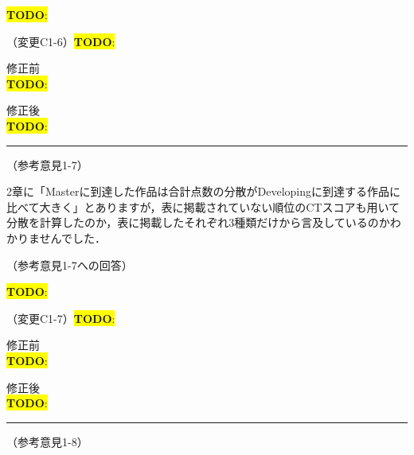 \documentclass{jarticle} %
\newcommand{\todo}[1]{\colorbox{yellow}{{\bf TODO}:}{\color{blue}{\textbf{[#1]}}}}
\def\subsection#1{ \vspace{1pc} {\gt #1} }
\def\nextans{ \vspace{2pc} \hrule }
\begin{document}
\todo{hoge}

\subsection{（変更C1-6）\todo{hoge}}
\vspace{-0.3cm}
\begin{description}
\item 修正前\\
\phantom{　}
\todo{hoge}
\vspace{-0.3cm}
\item 修正後\\
\phantom{　}
\todo{hoge}
\end{description}

\newpage
\nextans
\subsection{（参考意見1-7）}

2章に「Masterに到達した作品は合計点数の分散がDevelopingに到達する作品に比べて大きく」とありますが，表に掲載されていない順位のCTスコアも用いて分散を計算したのか，表に掲載したそれぞれ3種類だけから言及しているのかわかりませんでした．

\subsection{（参考意見1-7への回答）}

\todo{hoge}

\subsection{（変更C1-7）\todo{hoge}}
\vspace{-0.3cm}
\begin{description}
\item 修正前\\
\phantom{　}
\todo{hoge}
\vspace{-0.3cm}
\item 修正後\\
\phantom{　}
\todo{hoge}
\end{description}

\newpage
\nextans
\subsection{（参考意見1-8）}
\end{document}
